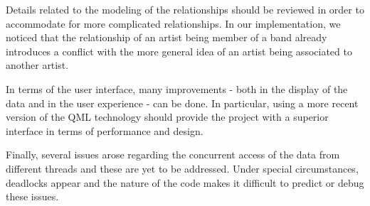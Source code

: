 \documentclass{sig-alternate}
\begin{document}
Details related to the modeling of the relationships should be reviewed in
order to accommodate for more complicated relationships. In our
implementation, we noticed that the relationship of an artist being member of
a band already introduces a conflict with the more general idea of an artist
being associated to another artist.

In terms of the user interface, many improvements - both in the display of the
data and in the user experience - can be done. In particular, using a more
recent version of the QML technology should provide the project with a
superior interface in terms of performance and design.

Finally, several issues arose regarding the concurrent access of the data from
different threads and these are yet to be addressed. Under special
circumstances, deadlocks appear and the nature of the code makes it difficult to
predict or debug these issues.



\balance
\end{document}
